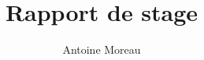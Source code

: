 \documentclass[a4paper,10pt]{article}
\title{Rapport de stage}
\author{Antoine Moreau}
\begin{document}
\maketitle

\begin{abstract}

\end{abstract}









\end{document}
